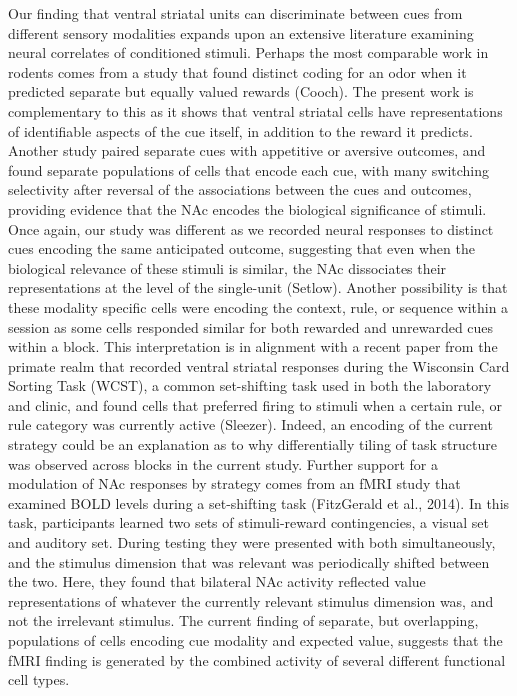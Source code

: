 \documentclass[11pt]{article}
\begin{document}
Our finding that ventral striatal units can discriminate between cues from different sensory modalities expands upon an extensive literature examining neural correlates of conditioned stimuli. Perhaps the most comparable work in rodents comes from a study that found distinct coding for an odor when it predicted separate but equally valued rewards (Cooch). The present work is complementary to this as it shows that ventral striatal cells have representations of identifiable aspects of the cue itself, in addition to the reward it predicts. Another study paired separate cues with appetitive or aversive outcomes, and found separate populations of cells that encode each cue, with many switching selectivity after reversal of the associations between the cues and outcomes, providing evidence that the NAc encodes the biological significance of stimuli. Once again, our study was different as we recorded neural responses to distinct cues encoding the same anticipated outcome, suggesting that even when the biological relevance of these stimuli is similar, the NAc dissociates their representations at the level of the single-unit (Setlow). Another possibility is that these modality specific cells were encoding the context, rule, or sequence within a session as some cells responded similar for both rewarded and unrewarded cues within a block. This interpretation is in alignment with a recent paper from the primate realm that recorded ventral striatal responses during the Wisconsin Card Sorting Task (WCST), a common set-shifting task used in both the laboratory and clinic, and found cells that preferred firing to stimuli when a certain rule, or rule category was currently active (Sleezer). Indeed, an encoding of the current strategy could be an explanation as to why differentially tiling of task structure was observed across blocks in the current study. Further support for a modulation of NAc responses by strategy comes from an fMRI study that examined BOLD levels during a set-shifting task (FitzGerald et al., 2014). In this task, participants learned two sets of stimuli-reward contingencies, a visual set and auditory set. During testing they were presented with both simultaneously, and the stimulus dimension that was relevant was periodically shifted between the two. Here, they found that bilateral NAc activity reflected value representations of whatever the currently relevant stimulus dimension was, and not the irrelevant stimulus. The current finding of separate, but overlapping, populations of cells encoding cue modality and expected value, suggests that the fMRI finding is generated by the combined activity of several different functional cell types. 
\end{document}
